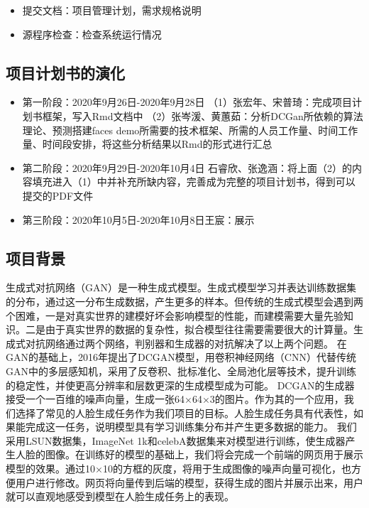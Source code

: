 \documentclass[
  hyperref, a4paper]{ctexart}
\providecommand{\tightlist}{%
  \setlength{\itemsep}{0pt}\setlength{\parskip}{0pt}}
\begin{document}
\begin{itemize}
\tightlist
\item
  提交文档：项目管理计划，需求规格说明
\item
  源程序检查：检查系统运行情况
\end{itemize}

\hypertarget{ux9879ux76eeux8ba1ux5212ux4e66ux7684ux6f14ux5316}{%
\subsection{项目计划书的演化}\label{ux9879ux76eeux8ba1ux5212ux4e66ux7684ux6f14ux5316}}

\begin{itemize}
\item
  第一阶段：2020年9月26日-2020年9月28日 \newline
  （1）张宏年、宋普琦：完成项目计划书框架，写入Rmd文档中 \newline
  （2）张岑湲、黄蕙茹：分析DCGan所依赖的算法理论、预测搭建faces
  \newline demo所需要的技术框架、所需的人员工作量、时间工作量、时间段安排，将这些分析结果以Rmd的形式进行汇总
\item
  第二阶段：2020年9月29日-2020年10月4日 \newline
  石睿欣、张逸涵：将上面（2）的内容填充进入（1）中并补充所缺内容，完善成为完整的项目计划书，得到可以提交的PDF文件
\item
  第三阶段：2020年10月5日-2020年10月8日\newline 王宸：展示
\end{itemize}

\hypertarget{ux9879ux76eeux80ccux666f}{%
\subsection{项目背景}\label{ux9879ux76eeux80ccux666f}}

生成式对抗网络（GAN）是一种生成式模型。生成式模型学习并表达训练数据集的分布，通过这一分布生成数据，产生更多的样本。但传统的生成式模型会遇到两个困难，一是对真实世界的建模好坏会影响模型的性能，而建模需要大量先验知识。二是由于真实世界的数据的复杂性，拟合模型往往需要需要很大的计算量。生成式对抗网络通过两个网络，判别器和生成器的对抗解决了以上两个问题。
在GAN的基础上，2016年提出了DCGAN模型，用卷积神经网络（CNN）代替传统GAN中的多层感知机，采用了反卷积、批标准化、全局池化层等技术，提升训练的稳定性，并使更高分辨率和层数更深的生成模型成为可能。
DCGAN的生成器接受一个一百维的噪声向量，生成一张64×64×3的图片。作为其的一个应用，我们选择了常见的人脸生成任务作为我们项目的目标。人脸生成任务具有代表性，如果能完成这一任务，说明模型具有学习训练集分布并产生更多数据的能力。
我们采用LSUN数据集，ImageNet
1k和celebA数据集来对模型进行训练，使生成器产生人脸的图像。在训练好的模型的基础上，我们将会完成一个前端的网页用于展示模型的效果。通过10×10的方框的灰度，将用于生成图像的噪声向量可视化，也方便用户进行修改。网页将向量传到后端的模型，获得生成的图片并展示出来，用户就可以直观地感受到模型在人脸生成任务上的表现。
\end{document}
